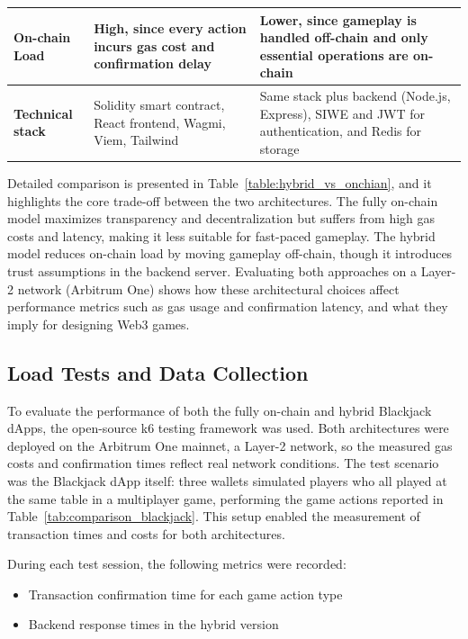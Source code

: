 \documentclass[10pt,conference]{IEEEtran}
\begin{document}
\begin{table}[h!]
\begin{tabular}{|p{3.2cm}|p{5.5cm}|p{5.5cm}|}
\textbf{On-chain Load} &
High, since every action incurs gas cost and confirmation delay &
Lower, since gameplay is handled off-chain and only essential operations are on-chain \\
\hline

\textbf{Technical stack} &
Solidity smart contract, React frontend, Wagmi, Viem, Tailwind &
Same stack plus backend (Node.js, Express), SIWE and JWT for authentication, and Redis for storage \\
\hline

\end{tabular}
\end{table}

Detailed comparison is presented in Table~\ref{table:hybrid_vs_onchian}, and it highlights the core trade-off between the two architectures. The fully on-chain model maximizes transparency and decentralization but suffers from high gas costs and latency, making it less suitable for fast-paced gameplay. The hybrid model reduces on-chain load by moving gameplay off-chain, though it introduces trust assumptions in the backend server. Evaluating both approaches on a Layer-2 network (Arbitrum One) shows how these architectural choices affect performance metrics such as gas usage and confirmation latency, and what they imply for designing Web3 games.


\subsection{Load Tests and Data Collection}
To evaluate the performance of both the fully on-chain and hybrid Blackjack dApps, the open-source k6 testing framework was used. Both architectures were deployed on the Arbitrum One mainnet, a Layer-2 network, so the measured gas costs and confirmation times reflect real network conditions. The test scenario was the Blackjack dApp itself: three wallets simulated players who all played at the same table in a multiplayer game, performing the game actions reported in Table~\ref{tab:comparison_blackjack}. This setup enabled the measurement of transaction times and costs for both architectures.

During each test session, the following metrics were recorded: 

\begin{itemize}
    \item Transaction confirmation time for each game action type
    \item Backend response times in the hybrid version
\end{itemize}
\end{document}

